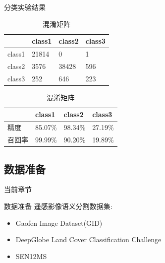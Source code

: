 \begin{frame}{分类实验结果}
    \begin{table}[h]
        \centering
        \begin{tabular}{ m{2cm} | m{2cm} | m{2cm} | m{2cm} | }
            \hline
             & class1 & class2 & class3 \\ \hline
            class1 & 21814 & 0 & 1 \\ \hline       
            class2 & 3576  & 38428 & 596 \\ \hline
            class3 & 252  &  646 &  223 \\ \hline            
        \end{tabular}
        \caption{混淆矩阵}
    \end{table}

    \begin{table}[h]
        \centering
        \begin{tabular}{ m{2cm} | m{2cm} | m{2cm} | m{2cm} | }
            \hline
             & class1 & class2 & class3 \\ \hline
            精度 & 85.07\% & 98.34\% & 27.19\% \\ \hline       
            召回率 & 99.99\% & 90.20\% & 19.89\% \\ \hline
        \end{tabular}
        \caption{混淆矩阵}
    \end{table}
\end{frame}

\subsection{数据准备}
\begin{frame}{当前章节}
\end{frame}

\begin{frame}{数据准备}
    遥感影像语义分割数据集:
    \begin{itemize}
        \item Gaofen Image Dataset(GID)
        \item DeepGlobe Land Cover Classification Challenge
        \item SEN12MS
    \end{itemize}
\end{frame}

